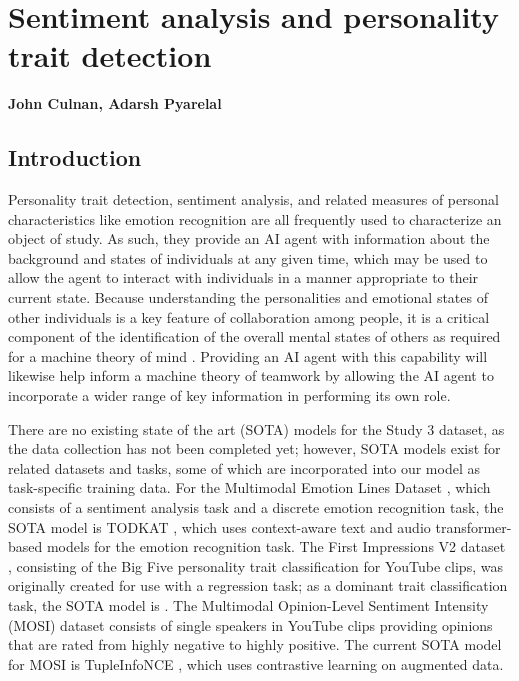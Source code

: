 \chapter{Sentiment analysis and personality trait detection}
\label{ch:sentiment_analysis}
\textbf{John Culnan, Adarsh Pyarelal}
\section{Introduction}

Personality trait detection, sentiment analysis, and related measures of
personal characteristics like emotion recognition are all frequently
used to characterize an object of study. As such, they provide an AI agent with
information about the background and states of individuals at any given time,
which may be used to allow the agent to interact with individuals in a manner
appropriate to their current state. Because understanding the personalities and
emotional states of other individuals is a key feature of collaboration among
people, it is a critical component of the identification of the overall mental
states of others as required for a machine theory of mind
\cite{Rabinowitz.ea:2018}. Providing an AI agent with this capability will
likewise help inform a machine theory of teamwork by allowing the AI agent to
incorporate a wider range of key information in performing its own role.

There are no existing state of the art (SOTA) models for the Study 3 dataset, as the
data collection has not been completed yet; however, SOTA models
exist for related datasets and tasks, some of which are incorporated into our
model as task-specific training data. For the Multimodal Emotion Lines Dataset
\cite{Poria.ea:2019}, which consists of a sentiment analysis task and a
discrete emotion recognition task, the
SOTA model is TODKAT \cite{Zhu.ea:2021}, which uses context-aware
text and audio transformer-based models for the emotion recognition task. The
First Impressions V2 dataset \cite{Ponce-Lopez.ea:2016}, consisting of the Big
Five personality trait classification for YouTube clips, was originally created
for use with a regression task; as a dominant trait classification task, the
SOTA model is \citet{Culnan.ea:2021}. The Multimodal Opinion-Level
Sentiment Intensity (MOSI) dataset \cite{Zadeh.ea:2016} consists of single
speakers in YouTube clips providing opinions that are rated from highly
negative to highly positive. The current SOTA model for MOSI is
TupleInfoNCE \cite{Liu.ea:2021}, which uses contrastive learning on augmented
data. 

